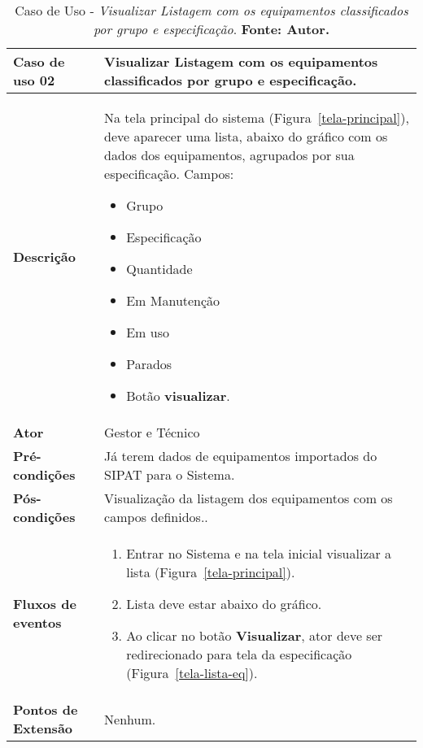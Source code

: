 \begin{apendicesenv}

\begin{table}[H]
\centering
\caption{Caso de Uso - \textit{Visualizar Listagem com os equipamentos classificados por grupo e especificação}. \textbf{Fonte: Autor.}}
\label{uc02}
\begin{tabular}{ | p{5cm} | p{10cm} |  }
\hline
	\textbf{Caso de uso 02} & Visualizar Listagem com os equipamentos classificados por grupo e especificação. \\ \hline
	\textbf{Descrição} & Na tela principal do sistema (Figura~\ref{tela-principal}), deve aparecer uma lista, abaixo do gráfico com os dados dos equipamentos, agrupados por sua especificação. Campos: \begin{itemize}
															                    \item Grupo 
															                    \item Especificação 
															                    \item Quantidade 
															                    \item Em Manutenção 
															                    \item Em uso
															                    \item Parados 
															                    \item Botão \textbf{visualizar}. 
															                    \end{itemize} \\ \hline
	\textbf{Ator} & Gestor e Técnico \\ \hline
	\textbf{Pré-condições} & Já terem dados de equipamentos importados do SIPAT para o Sistema. \\ \hline
	\textbf{Pós-condições} & Visualização da listagem dos equipamentos com os campos definidos.. \\ \hline
	\textbf{Fluxos de eventos} & \begin{enumerate}
									\item Entrar no Sistema e na tela inicial visualizar a lista (Figura~\ref{tela-principal}).    
									\item Lista deve estar abaixo do gráfico.
									\item Ao clicar no botão \textbf{Visualizar}, ator deve ser redirecionado para tela da especificação (Figura~\ref{tela-lista-eq}).   
								 \end{enumerate}   \\ \hline
	\textbf{Pontos de Extensão} & Nenhum. \\ \hline
\end{tabular}
\end{table}


\end{apendicesenv}
